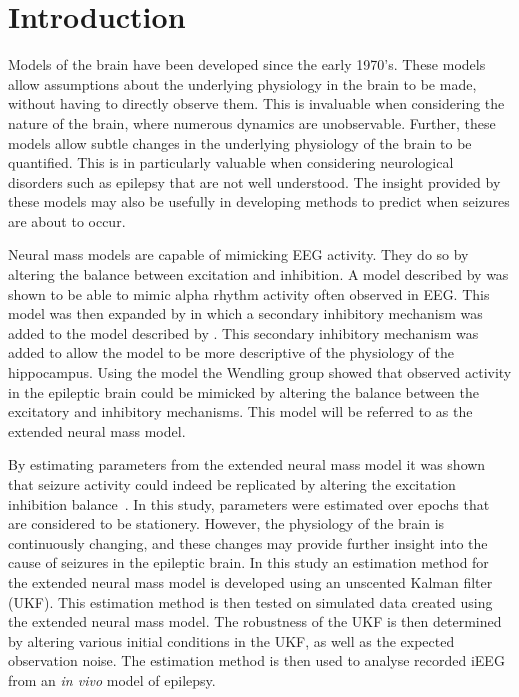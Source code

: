 \section{Introduction}

Models of the brain have been developed since the early 1970's. These models allow assumptions about the underlying physiology in the brain to be made, without having to directly observe them. This is invaluable when considering the nature of the brain, where numerous dynamics are unobservable. Further, these models allow subtle changes in the underlying physiology of the brain to be quantified. This is in particularly valuable when considering neurological disorders such as epilepsy that are not well understood. The insight provided by these models may also be usefully in developing methods to predict when seizures are about to occur.

Neural mass models are capable of mimicking EEG activity. They do so by altering the balance between excitation and inhibition. A model described by \cite{jansen1995electroencephalogram} was shown to be able to mimic alpha rhythm activity often observed in EEG. This model was then expanded by \cite{wendling2002epileptic} in which a secondary inhibitory mechanism was added to the model described by \cite{jansen1995electroencephalogram}. This secondary inhibitory mechanism was added to allow the model to be more descriptive of the physiology of the hippocampus. Using the model the Wendling group showed that observed activity in the epileptic brain could be mimicked by altering the balance between the excitatory and inhibitory mechanisms. This model will be referred to as the extended neural mass model.

By estimating parameters from the extended neural mass model it was shown that seizure activity could indeed be replicated by altering the excitation inhibition balance~\cite{wendling2005interictal}. In this study, parameters were estimated over epochs that are considered to be stationery. However, the physiology of the brain is continuously changing, and these changes may provide further insight into the cause of seizures in the epileptic brain. In this study an estimation method for the extended neural mass model is developed using an unscented Kalman filter (UKF). This estimation method is then tested on simulated data created using the extended neural mass model. The robustness of the UKF is then determined by altering various initial conditions in the UKF, as well as the expected observation noise. The estimation method is then used to analyse recorded iEEG from an \textsl{in vivo} model of epilepsy. 

